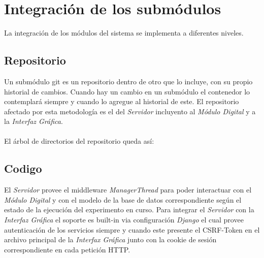 \section{Integraci\'on de los subm\'odulos}

La integraci\'on de los m\'odulos del sistema se implementa a diferentes niveles.

\subsection{Repositorio}

Un subm\'odulo git es un repositorio dentro de otro que lo incluye, con su propio historial de cambios. Cuando hay un cambio en un subm\'odulo el contenedor lo contemplar\'a siempre y cuando lo agregue al historial de este.
El repositorio afectado por esta metodolog\'ia es el del \textit{Servidor} incluyento al \textit{M\'odulo Digital} y a la \textit{Interfaz Gr\'afica}.
\\
\\
El \'arbol de directorios del repositorio queda as\'i:


\subsection{Codigo}
El \textit{Servidor} provee el middleware \textit{ManagerThread} para poder interactuar con el \textit{M\'odulo Digital} 
y con el modelo de la base de datos correspondiente seg\'un el estado de la ejecuci\'on del experimento en curso.
Para integrar el \textit{Servidor} con la \textit{Interfaz Gr\'afica} el soporte es built-in via configuraci\'on \textit{Django} el cual provee autenticaci\'on de los servicios siempre y cuando este presente el CSRF-Token en el archivo principal de la \textit{Interfax Gr\'afica} junto con la cookie de sesi\'on correspondiente en cada petici\'on HTTP.
\newpage

